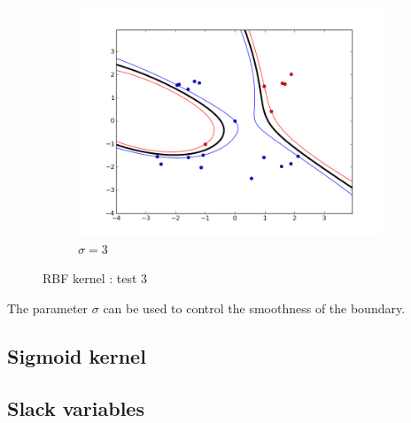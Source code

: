 \documentclass{article}
\begin{document}
\begin{figure}[!h]
\begin{subfigure}[b]{0.3\textwidth}
        \includegraphics[width=1.2\textwidth]{images/rbf/3/figure_3.png}
        \caption{$\sigma = 3$}  \label{rbf_3_figure_3}
    \end{subfigure}
    \caption{RBF kernel : test 3}
    \label{rbf_3}
\end{figure}


The parameter $\sigma$ can be used to control the smoothness of the boundary.

\subsection{Sigmoid kernel}

\subsection{Slack variables}
\end{document}
